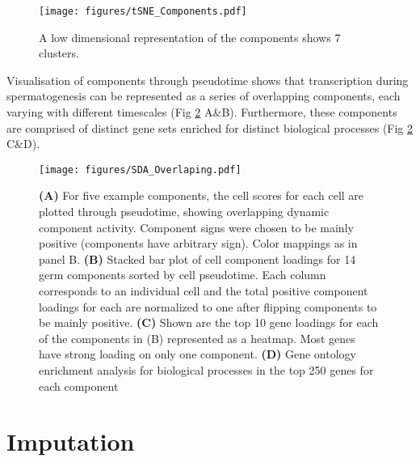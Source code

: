 \begin{figure}[H]
	\centering
	\texttt{[image: figures/tSNE\_Components.pdf]}
	\caption{A low dimensional representation of the components shows 7 clusters.}
	\label{fig:tSNE_Components}
\end{figure}

Visualisation of components through pseudotime shows that transcription during spermatogenesis can be represented as a series of overlapping components, each varying with different timescales (Fig \ref{fig:SDA_overlapping} A\&B). Furthermore, these components are comprised of distinct gene sets enriched for distinct biological processes (Fig \ref{fig:SDA_overlapping} C\&D).

\begin{figure}[H]
	\centering
	\texttt{[image: figures/SDA\_Overlaping.pdf]}
	\caption{
		\textbf{(A)} For five example components, the cell scores for each cell are plotted through pseudotime, showing overlapping dynamic component activity. Component signs were chosen to be mainly positive (components have arbitrary sign). Color mappings as in panel B.
		\textbf{(B)} Stacked bar plot of cell component loadings for 14 germ components sorted by cell pseudotime. Each column corresponds to an individual cell and the total positive component loadings for each are normalized to one after flipping components to be mainly positive.
		\textbf{(C)} Shown are the top 10 gene loadings for each of the components in (B) represented as a heatmap. Most genes have strong loading on only one component.
		\textbf{(D)} Gene ontology enrichment analysis for biological processes in the top 250 genes for each component }
	\label{fig:SDA_overlapping}
\end{figure}



\section{Imputation}

